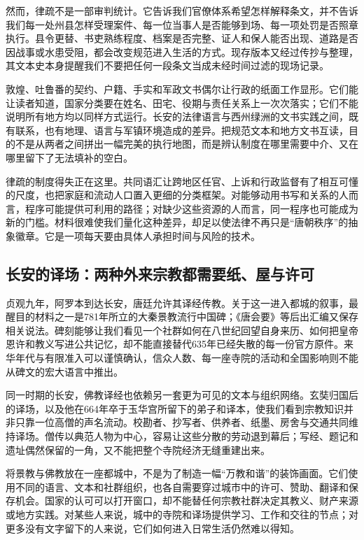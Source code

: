 然而，律疏不是一部审判统计。它告诉我们官僚体系希望怎样解释条文，并不告诉我们每一处州县怎样受理案件、每一位当事人是否能够到场、每一项处罚是否照章执行。县令更替、书吏熟练程度、档案是否完整、证人和保人能否出现、道路是否因战事或水患受阻，都会改变规范进入生活的方式。现存版本又经过传抄与整理，其文本史本身提醒我们不要把任何一段条文当成未经时间过滤的现场记录。

敦煌、吐鲁番的契约、户籍、手实和军政文书偶尔让行政的纸面工作显形。它们能让读者知道，国家分类要在姓名、田宅、役期与责任关系上一次次落实；它们不能说明所有地方均以同样方式运行。长安的法律语言与西州绿洲的文书实践之间，既有联系，也有地理、语言与军镇环境造成的差异。把规范文本和地方文书互读，目的不是从两者之间拼出一幅完美的执行地图，而是辨认制度在哪里需要中介、又在哪里留下了无法填补的空白。

律疏的制度得失正在这里。共同语汇让跨地区任官、上诉和行政监督有了相互可懂的尺度，也把家庭和流动人口置入更细的分类框架。对能够动用书写和关系的人而言，程序可能提供可利用的路径；对缺少这些资源的人而言，同一程序也可能成为新的门槛。材料很难使我们量化这种差异，却足以使法律不再只是“唐朝秩序”的抽象徽章。它是一项每天要由具体人承担时间与风险的技术。

\subsection{长安的译场：两种外来宗教都需要纸、屋与许可}
贞观九年，阿罗本到达长安，唐廷允许其译经传教。关于这一进入都城的叙事，最醒目的材料之一是781年所立的大秦景教流行中国碑；《唐会要》等后出汇编又保存相关说法。碑刻能够让我们看见一个社群如何在八世纪回望自身来历、如何把皇帝恩许和教义写进公共记忆，却不能直接替代635年已经失散的每一份官方原件。来华年代与有限准入可以谨慎确认，信众人数、每一座寺院的活动和全国影响则不能从碑文的宏大语言中推出。

同一时期的长安，佛教译经也依赖另一套更为可见的文本与组织网络。玄奘归国后的译场，以及他在664年卒于玉华宫所留下的弟子和译本，使我们看到宗教知识并非只靠一位高僧的声名流动。校勘者、抄写者、供养者、纸墨、房舍与交通共同维持译场。僧传以典范人物为中心，容易让这些分散的劳动退到幕后；写经、题记和遗址偶然保留的一角，又不能把整个寺院经济无缝重建出来。

将景教与佛教放在一座都城中，不是为了制造一幅“万教和谐”的装饰画面。它们使用不同的语言、文本和社群组织，也各自需要穿过城市中的许可、赞助、翻译和保存机会。国家的认可可以打开窗口，却不能替任何宗教社群决定其教义、财产来源或地方实践。对某些人来说，城中的寺院和译场提供学习、工作和交往的节点；对更多没有文字留下的人来说，它们如何进入日常生活仍然难以得知。

